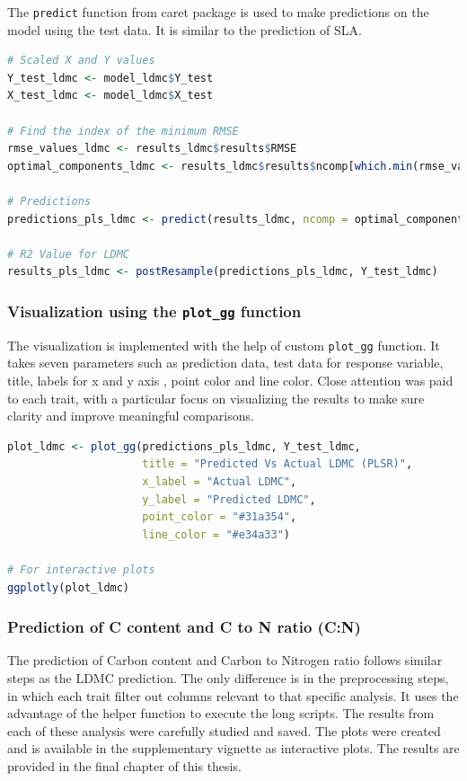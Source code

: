 \documentclass[12pt,a4paper]{report}
\begin{document}
The \texttt{predict} function from caret package is used to make predictions on the model using the test data. It is similar to the prediction of SLA.  \\

\begin{lstlisting}[language=R, style=mystyle]
# Scaled X and Y values
Y_test_ldmc <- model_ldmc$Y_test
X_test_ldmc <- model_ldmc$X_test

# Find the index of the minimum RMSE
rmse_values_ldmc <- results_ldmc$results$RMSE
optimal_components_ldmc <- results_ldmc$results$ncomp[which.min(rmse_values_ldmc)]

# Predictions
predictions_pls_ldmc <- predict(results_ldmc, ncomp = optimal_components_ldmc,  newdata = X_test_ldmc)

# R2 Value for LDMC
results_pls_ldmc <- postResample(predictions_pls_ldmc, Y_test_ldmc)
\end{lstlisting}

\subsubsection*{Visualization using the \texttt{plot\_gg} function}
The visualization is implemented with the help of custom \texttt{plot\_gg} function. It takes seven parameters such as prediction data, test data for response variable, title, labels for x and y axis , point color and line color. Close attention was paid to each trait, with a particular focus on visualizing the results to make sure clarity and improve meaningful comparisons. \\

\begin{lstlisting}[language=R, style=mystyle]
plot_ldmc <- plot_gg(predictions_pls_ldmc, Y_test_ldmc,
                     title = "Predicted Vs Actual LDMC (PLSR)",
                     x_label = "Actual LDMC",
                     y_label = "Predicted LDMC",
                     point_color = "#31a354",
                     line_color = "#e34a33")

# For interactive plots
ggplotly(plot_ldmc)
\end{lstlisting}

\subsubsection*{Prediction of C content and C to N ratio (C:N)}
The prediction of Carbon content and Carbon to Nitrogen ratio follows similar steps as the LDMC prediction. The only difference is in the preprocessing steps, in which each trait filter out columns relevant to that specific analysis. It uses the advantage of the helper function to execute the long scripts. The results from each of these analysis were carefully studied and saved. The plots were created and is available in the supplementary vignette as interactive plots. The results are provided in the final chapter of this thesis.
\end{document}
